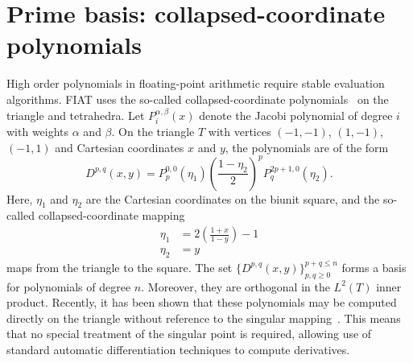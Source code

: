\section{Prime basis: collapsed-coordinate polynomials}

High order polynomials in floating-point arithmetic require stable
evaluation algorithms.  FIAT uses the so-called collapsed-coordinate
polynomials~\citep{KarniadakisSherwin2005} on the triangle and tetrahedra.  Let
\(P^{\alpha,\beta}_i(x) \) denote the Jacobi polynomial of degree \( i
\) with weights \( \alpha \) and \( \beta \).  On the triangle \( T \)
with vertices \( (-1,-1) \), \((1,-1) \), \( (-1,1) \) and Cartesian
coordinates \( x\) and \( y \), the polynomials are of the form
\begin{equation}
  D^{p,q}( x,y ) = P^{0,0}_{p}(\eta_1)  \left( \frac{1-\eta_2}{2}
  \right)^p P^{2p+1,0}_q(\eta_2).
\end{equation}
Here, \( \eta_1 \) and \( \eta_2 \) are the Cartesian coordinates on
the biunit square, and the so-called collapsed-coordinate mapping
\[
\begin{split}
\eta_1 & = 2\left( \frac{1+x}{1-y} \right) - 1
\\
\eta_2 & = y
\end{split}
\]
maps from the triangle to the square.  The set \( \{ D^{p,q}( x,y)
\}_{p,q \geqslant 0}^{p+q\leqslant n} \) forms a basis for polynomials of
degree \( n \).  Moreover, they are orthogonal in the \( L^2(T) \)
inner product.  Recently, it has been shown that these polynomials
may be computed directly on the triangle without reference to the
singular mapping~\citep{Kirby2009}.  This means that no special treatment
of the singular point is required, allowing use of standard automatic
differentiation techniques to compute derivatives.

